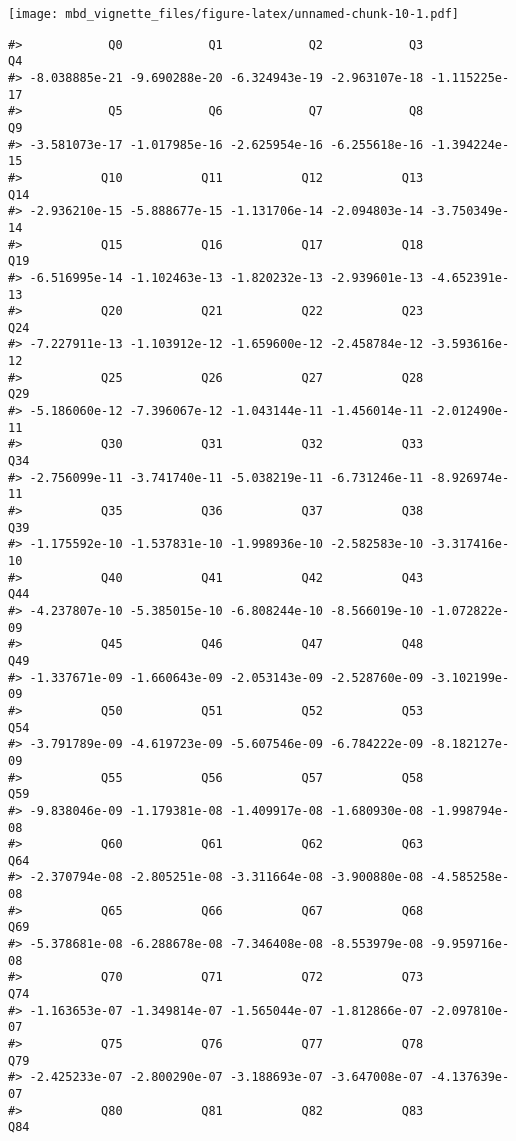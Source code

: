 \documentclass[]{article}
\begin{document}
\texttt{[image: mbd\_vignette\_files/figure-latex/unnamed-chunk-10-1.pdf]}

\begin{verbatim}
#>            Q0            Q1            Q2            Q3            Q4 
#> -8.038885e-21 -9.690288e-20 -6.324943e-19 -2.963107e-18 -1.115225e-17 
#>            Q5            Q6            Q7            Q8            Q9 
#> -3.581073e-17 -1.017985e-16 -2.625954e-16 -6.255618e-16 -1.394224e-15 
#>           Q10           Q11           Q12           Q13           Q14 
#> -2.936210e-15 -5.888677e-15 -1.131706e-14 -2.094803e-14 -3.750349e-14 
#>           Q15           Q16           Q17           Q18           Q19 
#> -6.516995e-14 -1.102463e-13 -1.820232e-13 -2.939601e-13 -4.652391e-13 
#>           Q20           Q21           Q22           Q23           Q24 
#> -7.227911e-13 -1.103912e-12 -1.659600e-12 -2.458784e-12 -3.593616e-12 
#>           Q25           Q26           Q27           Q28           Q29 
#> -5.186060e-12 -7.396067e-12 -1.043144e-11 -1.456014e-11 -2.012490e-11 
#>           Q30           Q31           Q32           Q33           Q34 
#> -2.756099e-11 -3.741740e-11 -5.038219e-11 -6.731246e-11 -8.926974e-11 
#>           Q35           Q36           Q37           Q38           Q39 
#> -1.175592e-10 -1.537831e-10 -1.998936e-10 -2.582583e-10 -3.317416e-10 
#>           Q40           Q41           Q42           Q43           Q44 
#> -4.237807e-10 -5.385015e-10 -6.808244e-10 -8.566019e-10 -1.072822e-09 
#>           Q45           Q46           Q47           Q48           Q49 
#> -1.337671e-09 -1.660643e-09 -2.053143e-09 -2.528760e-09 -3.102199e-09 
#>           Q50           Q51           Q52           Q53           Q54 
#> -3.791789e-09 -4.619723e-09 -5.607546e-09 -6.784222e-09 -8.182127e-09 
#>           Q55           Q56           Q57           Q58           Q59 
#> -9.838046e-09 -1.179381e-08 -1.409917e-08 -1.680930e-08 -1.998794e-08 
#>           Q60           Q61           Q62           Q63           Q64 
#> -2.370794e-08 -2.805251e-08 -3.311664e-08 -3.900880e-08 -4.585258e-08 
#>           Q65           Q66           Q67           Q68           Q69 
#> -5.378681e-08 -6.288678e-08 -7.346408e-08 -8.553979e-08 -9.959716e-08 
#>           Q70           Q71           Q72           Q73           Q74 
#> -1.163653e-07 -1.349814e-07 -1.565044e-07 -1.812866e-07 -2.097810e-07 
#>           Q75           Q76           Q77           Q78           Q79 
#> -2.425233e-07 -2.800290e-07 -3.188693e-07 -3.647008e-07 -4.137639e-07 
#>           Q80           Q81           Q82           Q83           Q84 

\end{verbatim}
\end{document}

